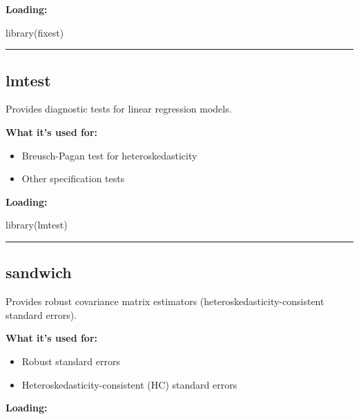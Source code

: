 \documentclass[
  letterpaper,
  DIV=11,
  numbers=noendperiod]{scrreprt}
\newenvironment{Shaded}{\begin{snugshade}}{\end{snugshade}}
\newcommand{\FunctionTok}[1]{\textcolor[rgb]{0.28,0.35,0.67}{#1}}
\newcommand{\NormalTok}[1]{\textcolor[rgb]{0.00,0.23,0.31}{#1}}
\providecommand{\tightlist}{%
  \setlength{\itemsep}{0pt}\setlength{\parskip}{0pt}}
\begin{document}
\textbf{Loading:}

\begin{Shaded}
\begin{Highlighting}[]
\FunctionTok{library}\NormalTok{(fixest)}
\end{Highlighting}
\end{Shaded}

\begin{center}\rule{0.5\linewidth}{0.5pt}\end{center}

\subsection{lmtest}\label{lmtest}

Provides diagnostic tests for linear regression models.

\textbf{What it's used for:}

\begin{itemize}
\tightlist
\item
  Breusch-Pagan test for heteroskedasticity
\item
  Other specification tests
\end{itemize}

\textbf{Loading:}

\begin{Shaded}
\begin{Highlighting}[]
\FunctionTok{library}\NormalTok{(lmtest)}
\end{Highlighting}
\end{Shaded}

\begin{center}\rule{0.5\linewidth}{0.5pt}\end{center}

\subsection{sandwich}\label{sandwich}

Provides robust covariance matrix estimators
(heteroskedasticity-consistent standard errors).

\textbf{What it's used for:}

\begin{itemize}
\tightlist
\item
  Robust standard errors
\item
  Heteroskedasticity-consistent (HC) standard errors
\end{itemize}

\textbf{Loading:}
\end{document}
